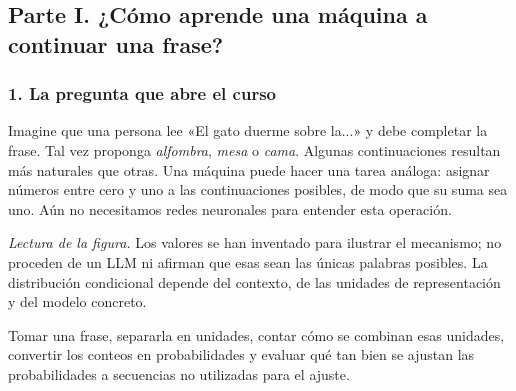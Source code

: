
\label{s01:mod:guia}

\subsection{Parte I. ¿Cómo aprende una máquina a continuar una frase?}

\subsubsection*{1. La pregunta que abre el curso}
Imagine que una persona lee «El gato duerme sobre la...» y debe completar la frase. Tal vez proponga \emph{alfombra}, \emph{mesa} o \emph{cama}. Algunas continuaciones resultan más naturales que otras. Una máquina puede hacer una tarea análoga: asignar números entre cero y uno a las continuaciones posibles, de modo que su suma sea uno. Aún no necesitamos redes neuronales para entender esta operación.

\begin{center}
\end{center}
\noindent\textit{Lectura de la figura.} Los valores se han inventado para ilustrar el mecanismo; no proceden de un LLM ni afirman que esas sean las únicas palabras posibles. La distribución condicional depende del contexto, de las unidades de representación y del modelo concreto.

\begin{idea}
Tomar una frase, separarla en unidades, contar cómo se combinan esas unidades, convertir los conteos en probabilidades y evaluar qué tan bien se ajustan las probabilidades a secuencias no utilizadas para el ajuste.
\end{idea}

